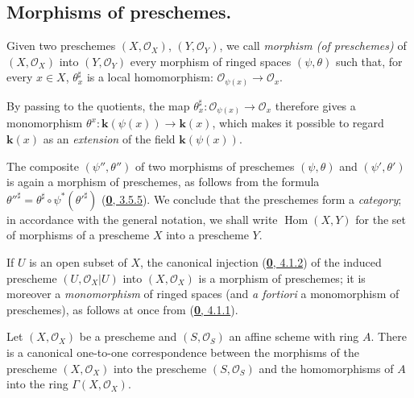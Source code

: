 \subsection{Morphisms of preschemes.}
\label{subsection:I.2.2}
\label{I.2.2}

\begin{definition}[2.2.1]
\label{I.2.2.1}
Given two preschemes $(X,\mathscr{O}_X)$, $(Y,\mathscr{O}_Y)$, we call
\emph{morphism (of preschemes)} of $(X,\mathscr{O}_X)$ into
$(Y,\mathscr{O}_Y)$ every morphism of ringed spaces $(\psi,\theta)$ such
that, for every $x\in X$, $\theta_x^\sharp$ is a local homomorphism:
$\mathscr{O}_{\psi(x)}\longrightarrow\mathscr{O}_x$.
\end{definition}


By passing to the quotients, the map
$\theta_x^\sharp:\mathscr{O}_{\psi(x)}\to\mathscr{O}_x$ therefore gives a
monomorphism $\theta^x:\boldsymbol{k}(\psi(x))\to\boldsymbol{k}(x)$, which makes it possible to
regard $\boldsymbol{k}(x)$ as an \emph{extension} of the field $\boldsymbol{k}(\psi(x))$.

\begin{env}[2.2.2]
\label{I.2.2.2}
The composite $(\psi'',\theta'')$ of two morphisms of preschemes
$(\psi,\theta)$ and $(\psi',\theta')$ is again a morphism of preschemes,
as follows from the formula
${\theta''}^\sharp=\theta^\sharp\circ\psi^*({\theta'}^\sharp)$
(\hyperref[0.3.5.5]{\textbf{0}, 3.5.5}). We conclude that the preschemes form
a \emph{category}; in accordance with the general notation, we shall write
$\operatorname{Hom}(X,Y)$ for the set of morphisms of a prescheme $X$ into
a prescheme $Y$.
\end{env}

\begin{example}[2.2.3]
\label{I.2.2.3}
If $U$ is an open subset of $X$, the canonical injection
(\hyperref[0.4.1.2]{\textbf{0}, 4.1.2}) of the induced prescheme
$(U,\mathscr{O}_X|U)$ into $(X,\mathscr{O}_X)$ is a morphism of
preschemes; it is moreover a \emph{monomorphism} of ringed spaces (and
\emph{a fortiori} a monomorphism of preschemes), as follows at once
from (\hyperref[0.4.1.1]{\textbf{0}, 4.1.1}).
\end{example}

\begin{proposition}[2.2.4]
\label{I.2.2.4}
Let $(X,\mathscr{O}_X)$ be a prescheme and $(S,\mathscr{O}_S)$ an affine
scheme with ring $A$. There is a canonical one-to-one correspondence between
the morphisms of the prescheme $(X,\mathscr{O}_X)$ into the prescheme
$(S,\mathscr{O}_S)$ and the homomorphisms of $A$ into the ring
$\Gamma(X,\mathscr{O}_X)$.
\end{proposition}

